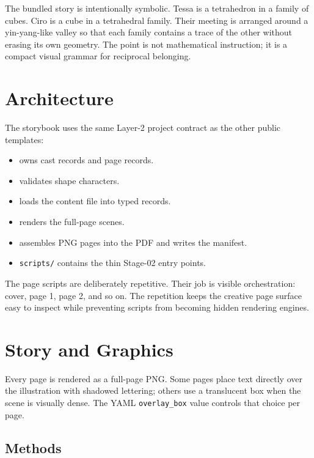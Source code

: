 \documentclass[
]{article}
\providecommand{\tightlist}{%
  \setlength{\itemsep}{0pt}\setlength{\parskip}{0pt}}
\begin{document}
The bundled story is intentionally symbolic. Tessa is a tetrahedron in a
family of cubes. Ciro is a cube in a tetrahedral family. Their meeting
is arranged around a yin-yang-like valley so that each family contains a
trace of the other without erasing its own geometry. The point is not
mathematical instruction; it is a compact visual grammar for reciprocal
belonging.

\newpage

\section{Architecture}\label{architecture}

The storybook uses the same Layer-2 project contract as the other public
templates:

\begin{itemize}
\tightlist
\item
   owns cast records and page records.
\item
   validates shape characters.
\item
   loads the content file into typed
  records.
\item
   renders the full-page scenes.
\item
   assembles PNG pages into the PDF
  and writes the manifest.
\item
  \texttt{scripts/} contains the thin Stage-02 entry points.
\end{itemize}

The page scripts are deliberately repetitive. Their job is visible
orchestration: cover, page 1, page 2, and so on. The repetition keeps
the creative page surface easy to inspect while preventing scripts from
becoming hidden rendering engines.

\newpage

\section{Story and Graphics}\label{story-and-graphics}

Every page is rendered as a full-page PNG. Some pages place text
directly over the illustration with shadowed lettering; others use a
translucent box when the scene is visually dense. The YAML
\texttt{overlay\_box} value controls that choice per page.

\subsection{Methods}\label{methods}
\end{document}
